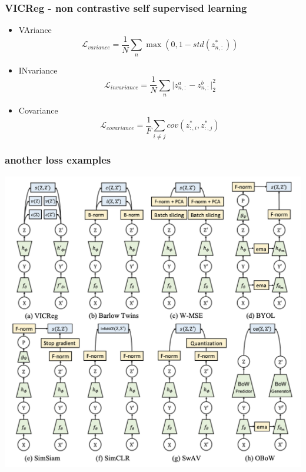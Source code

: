 \documentclass{beamer}
\begin{document}
\begin{frame}
  \frametitle{VICReg - non contrastive self supervised learning}

    \begin{itemize}
      \item VAriance    $$\mathcal{L}_{variance}   = \frac{1}{N} \sum_n \max(0, 1 - std(z^*_{n, :})) $$
      \item INvariance  $$\mathcal{L}_{invariance} = \frac{1}{N} \sum_n \vert z^a_{n,:} - z^b_{n,:} \vert^2_2 $$
      \item Covariance  $$\mathcal{L}_{covariance} = \frac{1}{F} \sum_{i \neq j} cov(z^*_{:, i}, z^*_{:, j}) $$
    \end{itemize}
     
\end{frame}



\begin{frame}
  \frametitle{another loss examples}

  \centering
  \includegraphics[scale=0.3]{../images/self_supervised_loss.png}
     
\end{frame}
\end{document}
